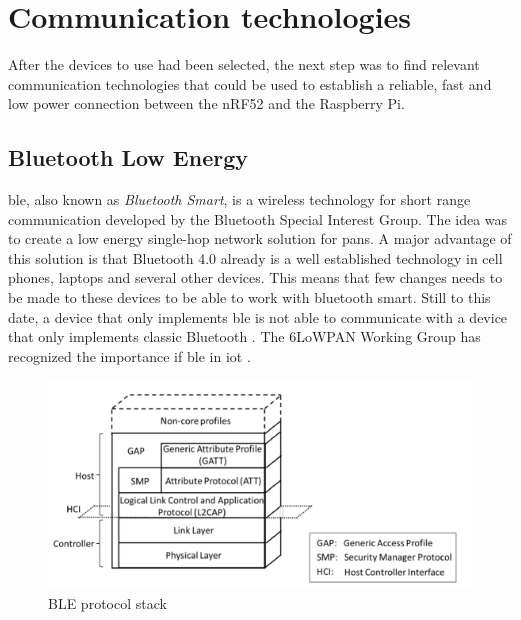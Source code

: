 \section{Communication technologies}

\noindent After the devices to use had been selected, the next step was to find relevant communication technologies that could be used to establish a reliable, fast and low power connection between the \gls{nRF52} and the \gls{Raspberry Pi}. 

\subsection{Bluetooth Low Energy}

\noindent \gls{ble}, also known as \textit{Bluetooth Smart}, is a wireless technology for short range communication developed by the Bluetooth Special Interest Group. The idea was to create a low energy single-hop network solution for \glspl{pan}. A major advantage of this solution is that Bluetooth 4.0 already is a well established technology in cell phones, laptops and several other devices. This means that few changes needs to be made to these devices to be able to work with bluetooth smart. Still to this date, a device that only implements \gls{ble} is not able to communicate with a device that only implements classic Bluetooth \cite{gomez2012overview}.
The 6LoWPAN Working Group has recognized the importance if \gls{ble} in \gls{iot} \cite{hui2008extending} .

\begin{figure}[ht]
    \centering
    \includegraphics[scale=0.7]{BLEprotocolStack.png}    
    \caption{BLE protocol stack}
    \label{fig:BLEprotocolStack}
\end{figure}

